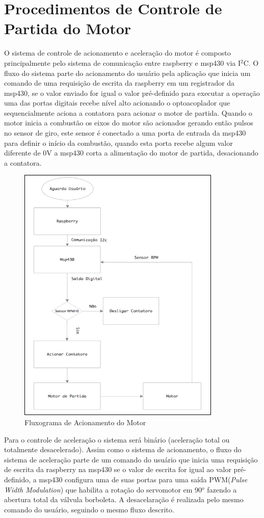 \section{Procedimentos de Controle de Partida do Motor}
O sistema de controle de acionamento e aceleração do motor é composto principalmente pelo sistema de comunicação entre raspberry e msp430 via I$^{2}$C. O fluxo do sistema parte do acionamento do usuário pela aplicação que inicia um comando de uma requisição de escrita da raspberry em um registrador da msp430, se o valor enviado for igual o valor pré-definido para executar a operação uma das portas digitais recebe nível alto acionando o optoacoplador que sequencialmente aciona a contatora para acionar o motor de partida. Quando o motor inicia a combustão os eixos do motor são acionados gerando então pulsos no sensor de giro, este sensor é conectado a uma porta de entrada da msp430 para definir o início da combustão, quando esta porta recebe algum valor diferente de 0V a msp430 corta a alimentação do motor de partida, desacionando a contatora.
\begin{figure}[h!]
	\centering
	\includegraphics[keepaspectratio=true,scale= 1.5]{figuras/fluxograma1.PNG}
	\caption{ Fluxograma de Acionamento do Motor}
	\label{ Fluxograma de Acionamento do Motor}
\end{figure}
Para o controle de aceleração o sistema será binário (aceleração total ou totalmente desacelerado). Assim como o sistema de acionamento, o fluxo do sistema de aceleração parte de um comando do usuário que inicia uma requisição de escrita da raspberry na msp430 se o valor de escrita for igual ao valor pré-definido, a msp430 configura uma de suas portas para uma saída PWM(\textit{Pulse Width Modulation}) que habilita a rotação do servomotor em 90$^{o}$ fazendo a abertura total da válvula borboleta. A desacelaração é realizada pelo mesmo comando do usuário, seguindo o mesmo fluxo descrito.
